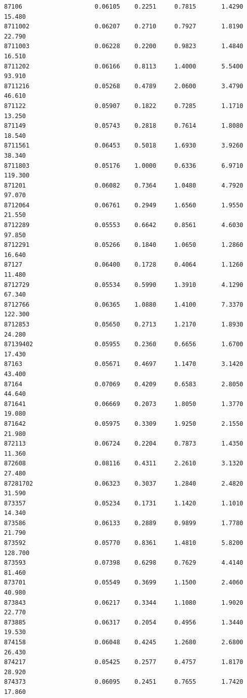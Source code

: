 \documentclass[
  letterpaper,
  DIV=11,
  numbers=noendperiod]{scrartcl}
\begin{document}
\begin{verbatim}
87106                    0.06105    0.2251     0.7815       1.4290  15.480
8711002                  0.06207    0.2710     0.7927       1.8190  22.790
8711003                  0.06228    0.2200     0.9823       1.4840  16.510
8711202                  0.06166    0.8113     1.4000       5.5400  93.910
8711216                  0.05268    0.4789     2.0600       3.4790  46.610
871122                   0.05907    0.1822     0.7285       1.1710  13.250
871149                   0.05743    0.2818     0.7614       1.8080  18.540
8711561                  0.06453    0.5018     1.6930       3.9260  38.340
8711803                  0.05176    1.0000     0.6336       6.9710 119.300
871201                   0.06082    0.7364     1.0480       4.7920  97.070
8712064                  0.06761    0.2949     1.6560       1.9550  21.550
8712289                  0.05553    0.6642     0.8561       4.6030  97.850
8712291                  0.05266    0.1840     1.0650       1.2860  16.640
87127                    0.06400    0.1728     0.4064       1.1260  11.480
8712729                  0.05534    0.5990     1.3910       4.1290  67.340
8712766                  0.06365    1.0880     1.4100       7.3370 122.300
8712853                  0.05650    0.2713     1.2170       1.8930  24.280
87139402                 0.05955    0.2360     0.6656       1.6700  17.430
87163                    0.05671    0.4697     1.1470       3.1420  43.400
87164                    0.07069    0.4209     0.6583       2.8050  44.640
871641                   0.06669    0.2073     1.8050       1.3770  19.080
871642                   0.05975    0.3309     1.9250       2.1550  21.980
872113                   0.06724    0.2204     0.7873       1.4350  11.360
872608                   0.08116    0.4311     2.2610       3.1320  27.480
87281702                 0.06323    0.3037     1.2840       2.4820  31.590
873357                   0.05234    0.1731     1.1420       1.1010  14.340
873586                   0.06133    0.2889     0.9899       1.7780  21.790
873592                   0.05770    0.8361     1.4810       5.8200 128.700
873593                   0.07398    0.6298     0.7629       4.4140  81.460
873701                   0.05549    0.3699     1.1500       2.4060  40.980
873843                   0.06217    0.3344     1.1080       1.9020  22.770
873885                   0.06317    0.2054     0.4956       1.3440  19.530
874158                   0.06048    0.4245     1.2680       2.6800  26.430
874217                   0.05425    0.2577     0.4757       1.8170  28.920
874373                   0.06095    0.2451     0.7655       1.7420  17.860

\end{verbatim}
\end{document}
